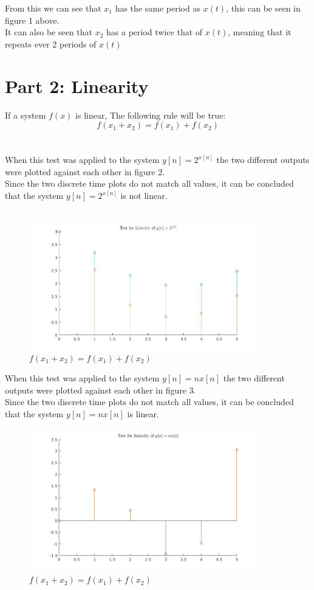 \documentclass[a4paper,11pt]{article}
\begin{document}
From this we can see that $x_1$ has the same period as $x(t)$, this can be seen in figure 1 above.\\ 
It can also be seen that $x_2$ has a period twice that of $x(t)$, meaning that it repeats ever 2 periods of $x(t)$
\newpage

\section*{Part 2: Linearity}
If a system $f(x)$ is linear, The following rule will be true:\\
$$f(x_1+x_2) = f(x_1)+f(x_2)$$\\ \\
When this test was applied to the system $y[n]=2^{x[n]}$ the two different outputs were plotted against each other in figure 2.\\
Since the two discrete time plots do not match all values, it can be concluded that the system $y[n]=2^{x[n]}$ is not linear.\\ \\
\begin{figure}[h]
\centering
\includegraphics[width=10cm]{linarity_test_1.jpg}
\caption{$f(x_1+x_2) = f(x_1)+f(x_2)$}
\end{figure}

When this test was applied to the system $y[n]=nx[n]$ the two different outputs were plotted against each other in figure 3.\\
Since the two discrete time plots do not match all values, it can be concluded that the system $y[n]=nx[n]$ is linear.
\begin{figure}[h]
\centering
\includegraphics[width=10cm]{linarity_test_2.jpg}
\caption{$f(x_1+x_2) = f(x_1)+f(x_2)$}
\end{figure}
\newpage
\end{document}
